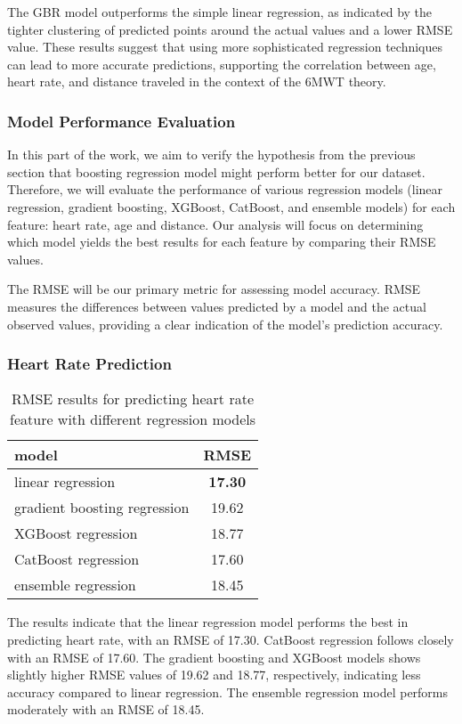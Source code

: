 The GBR model outperforms the simple linear regression, as indicated by the tighter clustering of predicted points around the actual values and a lower RMSE value. These results suggest that using more sophisticated regression techniques can lead to more accurate predictions, supporting the correlation between age, heart rate, and distance traveled in the context of the 6MWT theory.

\subsubsection*{Model Performance Evaluation}

In this part of the work, we aim to verify the hypothesis from the previous section that boosting regression model might perform better for our dataset. Therefore, we will evaluate the performance of various regression models (linear regression, gradient boosting, XGBoost, CatBoost, and ensemble models) for each feature: heart rate, age and distance. Our analysis will focus on determining which model yields the best results for each feature by comparing their RMSE values.

The RMSE will be our primary metric for assessing model accuracy. RMSE measures the differences between values predicted by a model and the actual observed values, providing a clear indication of the model's prediction accuracy.

\subsubsection*{Heart Rate Prediction} 

\FloatBarrier
\begin{table}[htbp]
\centering
\begin{tabular}{@{}lc@{}}
\toprule
model & RMSE \\ 
\midrule
linear regression & \textbf{17.30} \\
gradient boosting regression & 19.62 \\
XGBoost regression & 18.77 \\
CatBoost regression & 17.60 \\
ensemble regression & 18.45 \\ 
\bottomrule
\end{tabular}
\caption{RMSE results for predicting heart rate feature with different regression models}
\end{table}
\FloatBarrier

The results indicate that the linear regression model performs the best in predicting heart rate, with an RMSE of 17.30. CatBoost regression follows closely with an RMSE of 17.60. The gradient boosting and XGBoost models shows slightly higher RMSE values of 19.62 and 18.77, respectively, indicating less accuracy compared to linear regression. The ensemble regression model performs moderately with an RMSE of 18.45.


